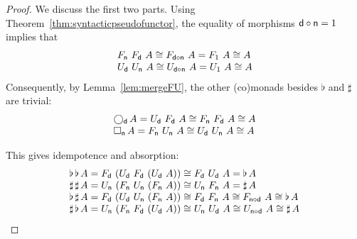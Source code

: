 \documentclass{drl-common/llncs}
\newcommand\compo[2]{\ensuremath{#1 \circ #2}}
\newcommand\F[2]{\ensuremath{F_{#1} \,\, #2}}
\newcommand\U[2]{\ensuremath{U_{#1} \,\, #2}}
\newcommand\Bx[2]{\ensuremath{\Box_{#1} \, {#2}}}
\newcommand\Crc[2]{\ensuremath{\bigcirc_{#1} \, {#2}}}
\newcommand\Flat[1]{\ensuremath{\flat \, {#1}}}
\newcommand\Sharp[1]{\ensuremath{\sharp \, {#1}}}
\newcommand\iso{\cong}
\begin{document}
\begin{proof}

We discuss the first two parts. Using
Theorem~\ref{thm:syntacticpseudofunctor}, the equality of morphisms
$\compo{\dsd d}{\dsd n} = 1$ implies that
\[
\begin{array}{l}
\F{\dsd{n}}{\F{\dsd{d}}{A}} \iso \F{\compo{\dsd d}{\dsd n}}{A} = \F{1}{A} \iso A\\
\U{\dsd{d}}{\U{\dsd{n}}{A}} \iso \U{\compo{\dsd d}{\dsd n}}{A} = \U{1}{A} \iso A\\
\end{array}
\]
Consequently, by Lemma~\ref{lem:mergeFU},
the other (co)monads besides $\flat$ and $\sharp$ are
trivial: 
\[
\begin{array}{l}
\Crc{\dsd{d}}{A} = \U{\dsd{d}}{\F{\dsd d}{A}} \iso \F{\dsd n}{\F{\dsd d}{A}} \iso A\\
\Bx{\dsd{n}}{A} = \F{\dsd{n}}{\U{\dsd n}{A}} \iso \U{\dsd d}{\U{\dsd n}{A}} \iso A
\end{array}
\]

This gives idempotence and absorption:
\[
\begin{array}{l}
\Flat{\Flat A} = \F{\dsd d}{(\U {\dsd d} {\F{\dsd d}{(\U {\dsd d} A)}})} \cong \F{\dsd d}{\U {\dsd d} A} = \Flat A\\
\Sharp{\Sharp A} = \U{\dsd n}{(\F {\dsd n} {\U{\dsd n}{(\F {\dsd n} A)}})} \cong \U{\dsd n}{\F {\dsd n} A} = \Sharp A\\
\Flat{\Sharp A} = \F{\dsd d}{(\U{\dsd d}{\U{\dsd n}{(\F{\dsd n}{A})}})} 
\cong \F{\dsd d}{\F{\dsd n}{A}}
\cong \F{\compo{\dsd n}{\dsd d}}{A} \cong \Flat A \\

\Sharp{\Flat A} = \U{\dsd n}{(\F{\dsd n}{\F{\dsd d}{(\U{\dsd d}{A})}})} 
\cong \U{\dsd n}{\U{\dsd d}{A}}
\cong \U{\compo{\dsd n}{\dsd d}}{A} \cong \Sharp A \\
\end{array}
\]


\end{proof}
\end{document}

